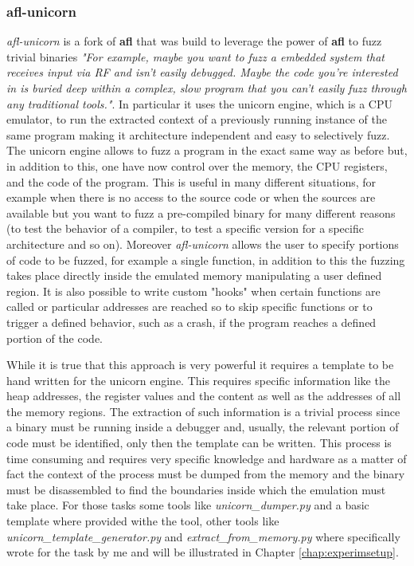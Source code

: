 \documentclass[../main.tex]{subfiles}
\begin{document}
\subsubsection{afl-unicorn}
\label{sub:afl-unicorn}

\textit{afl-unicorn} is a fork of \textbf{\acrshort{afl}}  that was build to leverage the power of \textbf{\acrshort{afl}} to fuzz trivial binaries \textit{"For example, maybe you want to fuzz a embedded system that receives input via RF and isn’t easily debugged. Maybe the code you’re interested in is buried deep within a complex, slow program that you can’t easily fuzz through any traditional tools."}\cite{aflunicorn}. In particular it uses the unicorn engine\cite{unicorn}, which is a CPU emulator, to run the extracted context of a previously running instance of the same program making it architecture independent and easy to selectively fuzz. The unicorn engine allows to fuzz a program in the exact same way as before but, in addition to this, one have now control over the memory, the CPU registers, and the code of the program. This is useful in many different situations, for example when there is no access to the source code or when the sources are available but you want to fuzz a pre-compiled binary for many different reasons (to test the behavior of a compiler, to test a specific version for a specific architecture and so on). Moreover \textit{afl-unicorn} allows the user to specify portions of code to be fuzzed, for example a single function, in addition to this the fuzzing takes place directly inside the emulated memory manipulating a user defined region. It is also possible to write custom "hooks" when certain functions are called or particular addresses are reached so to skip specific functions or to trigger a defined behavior, such as a crash, if the program reaches a defined portion of the code.

While it is true that this approach is very powerful it requires a template  to be hand written for the unicorn engine. This requires specific information like the heap addresses, the register values and the content as well as the addresses of all the memory regions. The extraction of such information is a trivial process since a binary must be running inside a debugger and, usually, the relevant portion of code must be identified, only then the template can be written. This process is time consuming and requires very specific knowledge and hardware as a matter of fact the context of the process must be dumped from the memory and the binary must be disassembled to find the boundaries inside which the emulation must take place. For those tasks some tools like \textit{unicorn\_dumper.py} and a basic template where provided withe the tool, other tools like \textit{unicorn\_template\_generator.py} and \textit{extract\_from\_memory.py} where specifically wrote for the task by me and will be illustrated in Chapter \ref{chap:experimsetup}.
\end{document}
